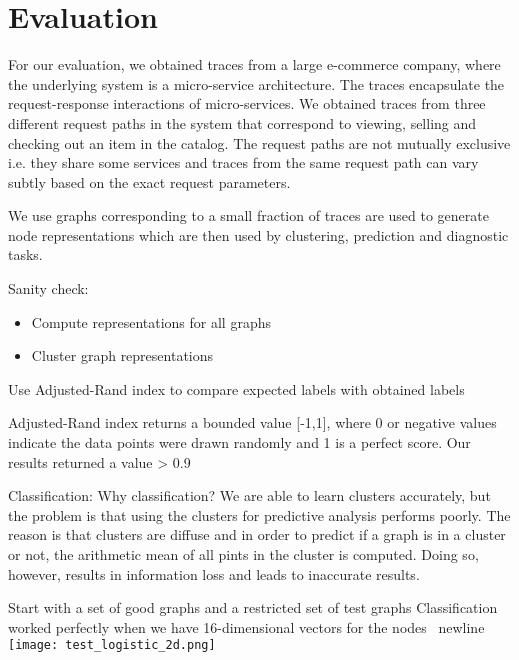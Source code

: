 \section{Evaluation}

For our evaluation, we obtained traces from a large e-commerce company, where the underlying system is a micro-service architecture. The traces encapsulate the request-response interactions of micro-services. We obtained traces from three different request paths in the system that correspond to viewing, selling and checking out an item in the catalog. The request paths are not mutually exclusive i.e. they share some services and traces from the same request path can vary subtly based on the exact request parameters.

We use graphs corresponding to a small fraction of traces are used to generate node representations which are then used by clustering, prediction and diagnostic tasks. 

Sanity check: 
\begin{itemize}
\item Compute representations for all graphs
\item Cluster graph representations
\end{itemize}
Use Adjusted-Rand index to compare expected labels with obtained labels

Adjusted-Rand index returns a bounded value [-1,1], where 0 or negative values indicate the data points were drawn randomly and 1 is a perfect score. Our results returned a value > 0.9

Classification:
Why classification? 
We are able to learn clusters accurately, but the problem is that using the clusters for predictive analysis performs poorly. The reason is that clusters are diffuse and in order to predict if a graph is in a cluster or not, the arithmetic mean of all pints in the cluster is computed. Doing so, however, results in information loss and leads to inaccurate results.

Start with a set of good graphs and a restricted set of test graphs
Classification worked perfectly when we have 16-dimensional vectors for the nodes \ newline
\texttt{[image: test\_logistic\_2d.png]} \newline

